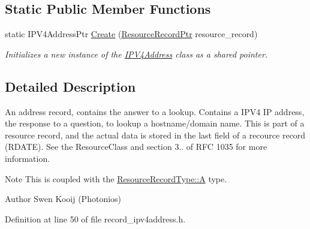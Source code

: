 \subsection*{Static Public Member Functions}
\begin{DoxyCompactItemize}
\item 
static I\-P\-V4\-Address\-Ptr \hyperlink{class_senergy_1_1_dns_1_1_records_1_1_i_p_v4_address_a6fefbdd798db0e2e33b66af9fde0c33f}{Create} (\hyperlink{namespace_senergy_1_1_dns_a1fa04259a07ce7a270e09288aa456ffd}{Resource\-Record\-Ptr} resource\-\_\-record)
\begin{DoxyCompactList}\small\item\em Initializes a new instance of the \hyperlink{class_senergy_1_1_dns_1_1_records_1_1_i_p_v4_address}{I\-P\-V4\-Address} class as a shared pointer. \end{DoxyCompactList}\end{DoxyCompactItemize}


\subsection{Detailed Description}
An address record, contains the answer to a lookup. Contains a I\-P\-V4 I\-P address, the response to a question, to lookup a hostname/domain name. This is part of a resource record, and the actual data is stored in the last field of a recource record (R\-D\-A\-T\-E). See the Resource\-Class and section 3.. of R\-F\-C 1035 for more information. 

\begin{DoxyNote}{Note}
This is coupled with the \hyperlink{namespace_senergy_1_1_dns_a590bfd748c955364770f5ce358d9dfe0a7fc56270e7a70fa81a5935b72eacbe29}{Resource\-Record\-Type\-::\-A} type.
\end{DoxyNote}
\begin{DoxyAuthor}{Author}
Swen Kooij (Photonios) 
\end{DoxyAuthor}


Definition at line 50 of file record\-\_\-ipv4address.\-h.



